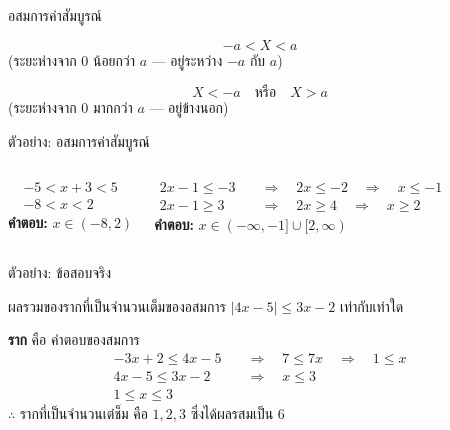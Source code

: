 \documentclass[11pt, aspectratio=169]{beamer}
\begin{document}
\begin{frame}{อสมการค่าสัมบูรณ์}
  \begin{explanation}[แบบที่ 1: $|X| < a$ ($a > 0$)]
    \[
      -a < X < a
    \]
    (ระยะห่างจาก 0 น้อยกว่า $a$ — อยู่ระหว่าง $-a$ กับ $a$)
  \end{explanation}

  \begin{explanation}[แบบที่ 2: $|X| > a$ ($a > 0$)]
    \[
      X < -a \quad \textbf{หรือ} \quad X > a
    \]
    (ระยะห่างจาก 0 มากกว่า $a$ — อยู่ข้างนอก)
  \end{explanation}
\end{frame}

\begin{frame}{ตัวอย่าง: อสมการค่าสัมบูรณ์}
  \begin{columns}[T]
      \begin{exambox}[โจทย์ 1: $|x + 3| < 5$]
        \begin{align*}
          -5 < x + 3 < 5 \\
          -8 < x < 2
        \end{align*}
        \textbf{คำตอบ:} $x \in (-8, 2)$
      \end{exambox}
      \begin{exambox}
        \begin{align*}
          2x - 1 \leq -3 \quad &\Rightarrow \quad 2x \leq -2 \quad \Rightarrow \quad x \leq -1 \\
          2x - 1 \geq 3 \quad &\Rightarrow \quad 2x \geq 4 \quad \Rightarrow \quad x \geq 2
        \end{align*}
        \textbf{คำตอบ:} $x \in (-\infty, -1] \cup [2, \infty)$
      \end{exambox}
  \end{columns}
\end{frame}

\begin{frame}{ตัวอย่าง: ข้อสอบจริง}
  \begin{exambox}[ข้อสอบปี 67 ข้อ 16]
    ผลรวมของรากที่เป็นจำนวนเต็มของอสมการ $\lvert4x-5\rvert \leq 3x-2$ เท่ากับเท่าใด
  \end{exambox}

  \begin{solbox}
    \textbf{ราก} คือ คำตอบของสมการ
    \begin{align*}
      -3x+2 \leq 4x-5 \quad &\Rightarrow \quad 7 \leq 7x \quad \Rightarrow \quad 1 \leq x \\
      4x-5\leq 3x - 2 \quad &\Rightarrow \quad x \leq 3 \\
      1 \leq x \leq 3
    \end{align*}
    $\therefore$ รากที่เป็นจำนวนเต๋ช็ม คือ $1,2,3$ ซึ่งได้ผลรสมเป็น $6$
  \end{solbox}
\end{frame}
\end{document}
